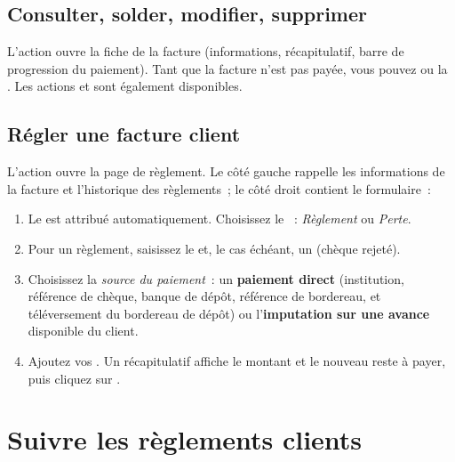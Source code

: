 \subsection{Consulter, solder, modifier, supprimer}

L'action  ouvre la fiche de la facture (informations, récapitulatif, barre de progression du paiement). Tant que la facture n'est pas payée, vous pouvez  ou la . Les actions  et  sont également disponibles.


\subsection{Régler une facture client}

L'action  ouvre la page de règlement. Le côté gauche rappelle les informations de la facture et l'historique des règlements~; le côté droit contient le formulaire~:

\begin{enumerate}
  \item Le  est attribué automatiquement. Choisissez le ~: \emph{Règlement} ou \emph{Perte}.
  \item Pour un règlement, saisissez le  et, le cas échéant, un  (chèque rejeté).
  \item Choisissez la \emph{source du paiement}~: un \textbf{paiement direct} (institution, référence de chèque, banque de dépôt, référence de bordereau, et téléversement du bordereau de dépôt) ou l'\textbf{imputation sur une avance} disponible du client.
  \item Ajoutez vos . Un récapitulatif affiche le montant et le nouveau reste à payer, puis cliquez sur .
\end{enumerate}


\section{Suivre les règlements clients}

